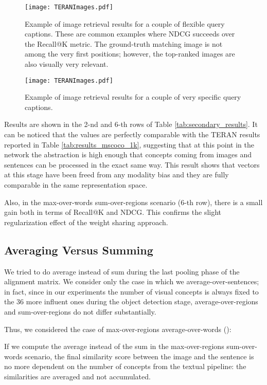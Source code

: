 \documentclass[acmsmall]{acmart}
\begin{document}
\begin{figure*}[t]
    \centering
    \texttt{[image: TERANImages.pdf]}
  \caption{Example of image retrieval results for a couple of flexible query captions. These are common examples where NDCG succeeds over the Recall@K metric. The ground-truth matching image is not among the very first positions; however, the top-ranked images are also visually very relevant.}
  \label{fig:examples_ndcg} 
\end{figure*}

\begin{figure*}[t]
    \centering
    \texttt{[image: TERANImages.pdf]}
  \caption{Example of image retrieval results for a couple of very specific query captions.}
  \label{fig:examples_exact_matching} 
\end{figure*}



Results are shown in the 2-nd and 6-th rows of Table \ref{tab:secondary_results}. It can be noticed that the values are perfectly comparable with the TERAN results reported in Table \ref{tab:results_mscoco_1k}, suggesting that at this point in the network the abstraction is high enough that concepts coming from images and sentences can be processed in the exact same way. This result shows that vectors at this stage have been freed from any modality bias and they are fully comparable in the same representation space.

Also, in the max-over-words sum-over-regions scenario (6-th row), there is a small gain both in terms of Recall@K and NDCG. This confirms the slight regularization effect of the weight sharing approach.

\subsection{Averaging Versus Summing}
We tried to do average instead of sum during the last pooling phase of the alignment matrix.
We consider only the case in which we average-over-sentences; in fact, since in our experiments the number of visual concepts is always fixed to the 36 more influent ones during the object detection stage, average-over-regions and sum-over-regions do not differ substantially.

Thus, we considered the case of max-over-regions average-over-words ():


If we compute the average instead of the sum in the max-over-regions sum-over-words scenario, the final similarity score between the image and the sentence is no more dependent on the number of concepts from the textual pipeline: the similarities are averaged and not accumulated.
\end{document}

